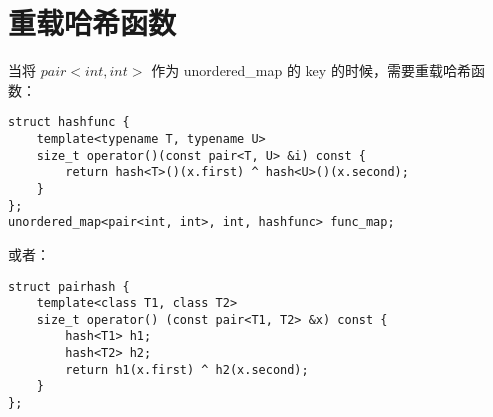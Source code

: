 \section{重载哈希函数}
当将 $pair<int, int>$ 作为 unordered\_map 的 key 的时候，需要重载哈希函数：
\begin{verbatim}
struct hashfunc {
    template<typename T, typename U>
    size_t operator()(const pair<T, U> &i) const {
        return hash<T>()(x.first) ^ hash<U>()(x.second);
    }
};
unordered_map<pair<int, int>, int, hashfunc> func_map;
\end{verbatim}

或者：
\begin{verbatim}
struct pairhash {
    template<class T1, class T2>
    size_t operator() (const pair<T1, T2> &x) const {
        hash<T1> h1;
        hash<T2> h2;
        return h1(x.first) ^ h2(x.second);
    }
};
\end{verbatim}
